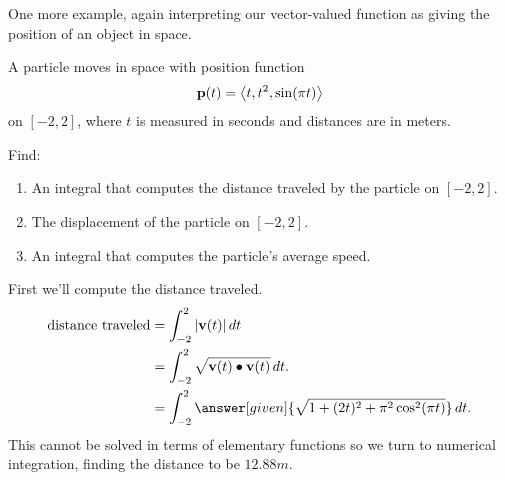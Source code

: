 \documentclass{ximera}
\begin{document}
One more example, again interpreting our vector-valued function as
giving the position of an object in space.

\begin{example}
  A particle moves in space with position function
  \[
  \mathbf{p}(t) =\left\langle t,t^2,\sin (\pi t)\right\rangle
  \]
  on $[-2,2]$, where $t$ is measured in seconds and distances are in
  meters.
  \begin{image}
\end{image}

  Find:
\begin{enumerate}
\item An integral that computes the distance traveled by the particle
  on $[-2,2]$.
\item The displacement of the particle on $[-2,2]$.
\item An integral that computes the particle's average speed.
\end{enumerate}
\begin{explanation}
  First we'll compute the distance traveled.
  \begin{align*}
    \text{distance traveled} &= \int_{-2}^2 |\vec{v}(t)|\d t \\
    &= \int_{-2}^2 \sqrt{\vec{v}(t)\dotp \vec{v}(t)}\d t.\\
    &= \int_{-2}^2 \answer[given]{\sqrt{1+(2t)^2+ \pi^2\cos^2(\pi t)}}\d t.
  \end{align*}
  This cannot be solved in terms of elementary functions so we turn
  to numerical integration, finding the distance to be
  $12.88\unit{m}$.
  

\end{explanation}
\end{example}
\end{document}
